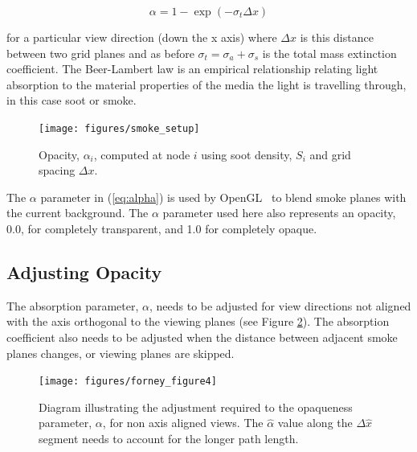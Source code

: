 {\begin{equation}
\label{eq:alpha}
\alpha=1-\exp(-\sigma_t\Delta x)
\end{equation}

\noindent for a particular view direction (down the x axis) where $\Delta x$ is this distance between two grid planes and as before $\sigma_t=\sigma_a+\sigma_s$ is the total mass extinction coefficient.  The Beer-Lambert law is an empirical relationship relating light absorption to the material properties of the media the light is travelling through, in this case soot or smoke.

\begin{figure}[\figoptions]
\begin{center}
\texttt{[image: figures/smoke\_setup]}
\end{center}
\caption {Opacity, $\alpha_i$, computed at node $i$ using soot density, $S_i$ and grid spacing $\Delta x$.}
\label{figsmokesetup}
\end{figure}

The $\alpha$ parameter in (\ref{eq:alpha}) is used by OpenGL~\cite{OpenGLRed} to blend smoke planes with the current background.  The $\alpha$ parameter used here also represents an opacity, 0.0, for completely transparent, and 1.0 for completely opaque.


\subsection{Adjusting Opacity}

The absorption parameter, $\alpha$, needs to be adjusted for view directions not aligned with the axis orthogonal to the viewing planes (see Figure \ref{figray}).  The absorption coefficient also needs to be adjusted when the distance between adjacent smoke planes changes, or viewing planes are skipped.

\begin{figure}[\figoptions]
\centerline{\texttt{[image: figures/forney\_figure4]}}
\caption [Diagram illustrating the adjustment required to the opaqueness parameter, $\alpha$,
for non-axis aligned views.] { Diagram
illustrating the adjustment required to the opaqueness parameter, $\alpha$,
for non axis aligned views. The $\hat{\alpha}$ value along the $\Delta\hat{x}$ segment needs to account for
the longer path length. } \label{figray}
\end{figure}

}
